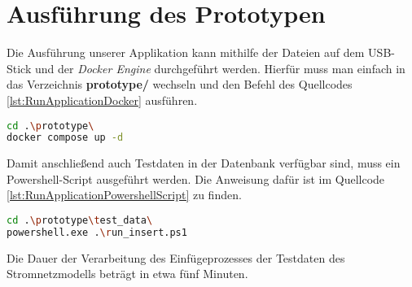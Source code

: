\section{Ausführung des Prototypen}

Die Ausführung unserer Applikation kann mithilfe der Dateien auf dem USB-Stick und der \emph{Docker Engine} durchgeführt werden. Hierfür muss man einfach in das Verzeichnis \textbf{prototype/} wechseln und den Befehl des Quellcodes \ref{lst:RunApplicationDocker} ausführen.

\begin{lstlisting}[language={bash},caption={Applikation ausführen mittels Docker Compose},label={lst:RunApplicationDocker},captionpos=b]
cd .\prototype\
docker compose up -d
\end{lstlisting}

Damit anschließend auch Testdaten in der Datenbank verfügbar sind, muss ein Powershell-Script ausgeführt werden. Die Anweisung dafür ist im Quellcode \ref{lst:RunApplicationPowershellScript} zu finden.

\begin{lstlisting}[language={bash},caption={Testdaten in PostgreSQL einspielen},label={lst:RunApplicationPowershellScript},captionpos=b]
cd .\prototype\test_data\
powershell.exe .\run_insert.ps1
\end{lstlisting}

Die Dauer der Verarbeitung des Einfügeprozesses der Testdaten des Stromnetzmodells beträgt in etwa fünf Minuten.